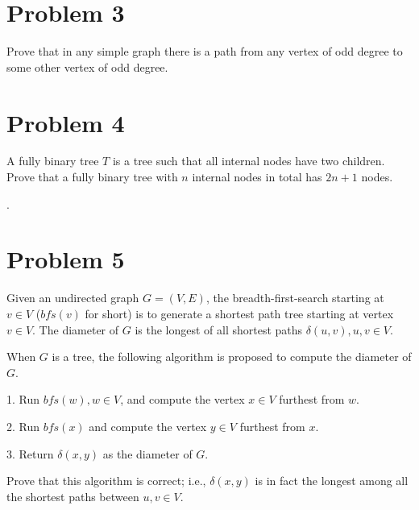 \documentclass[11pt]{article}
\begin{document}

\newpage
\section*{Problem 3}

Prove that in any simple graph there is a path from any vertex of odd degree
to some other vertex of odd degree.
\newline


\newpage
\section*{Problem 4}

A fully binary tree $T$ is a tree such that all internal nodes have
two children. Prove that a fully binary tree with $n$ internal nodes
in total has $2n+1$ nodes.
\newline


\newpage.
\section*{Problem 5}

Given an undirected graph $G=(V,E)$, the breadth-first-search starting at $v\in V$
($bfs(v)$ for short) is to generate a shortest path tree starting at vertex
$v\in V$. The diameter of $G$ is the longest of all shortest paths $\delta(u,v), u,v\in V$.
\newline

When $G$ is a tree, the following algorithm is proposed to compute the
diameter of $G$.
\newline

1. Run $bfs(w), w\in V$, and compute the vertex $x\in V$ furthest from $w$.

2. Run $bfs(x)$ and compute the vertex $y\in V$ furthest from $x$.

3. Return $\delta(x,y)$ as the diameter of $G$.
\newline

Prove that this algorithm is correct; i.e., $\delta(x,y)$ is in fact the
longest among all the shortest paths between $u,v\in V$.
\newline

\end{document}
